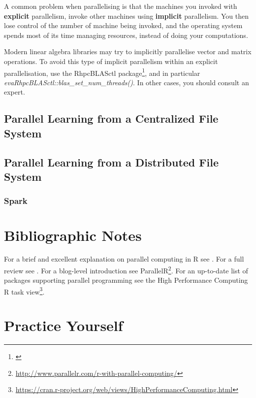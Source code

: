 \documentclass[]{book}
\renewcommand{\href}[2]{#2\footnote{\url{#1}}}
\theoremstyle{definition}
\theoremstyle{definition}
\theoremstyle{definition}
\theoremstyle{remark}
\begin{document}
A common problem when parallelising is that the machines you invoked with \textbf{explicit} parallelism, invoke other machines using \textbf{implicit} parallelism.
You then lose control of the number of machine being invoked, and the operating system spends most of its time managing resources, instead of doing your computations.

Modern linear algebra libraries may try to implicitly parallelise vector and matrix operations.
To avoid this type of implicit parallelism within an explicit parallelisation, use the \href{}{RhpcBLASctl package}, and in particular \emph{evaRhpcBLASctl::blas\_set\_num\_threads()}.
In other cases, you should consult an expert.

\hypertarget{parallel-learning-from-a-centralized-file-system}{%
\subsection{Parallel Learning from a Centralized File System}\label{parallel-learning-from-a-centralized-file-system}}

\hypertarget{parallel-learning-from-a-distributed-file-system}{%
\subsection{Parallel Learning from a Distributed File System}\label{parallel-learning-from-a-distributed-file-system}}

\hypertarget{spark}{%
\subsubsection{Spark}\label{spark}}

\hypertarget{bibliographic-notes-14}{%
\section{Bibliographic Notes}\label{bibliographic-notes-14}}

For a brief and excellent explanation on parallel computing in R see \citet{schmidberger2009state}.
For a full review see \citet{chapple2016mastering}.
For a blog-level introduction see \href{http://www.parallelr.com/r-with-parallel-computing/}{ParallelR}.
For an up-to-date list of packages supporting parallel programming see the High Performance Computing \href{https://cran.r-project.org/web/views/HighPerformanceComputing.html}{R task view}.

\hypertarget{practice-yourself-12}{%
\section{Practice Yourself}\label{practice-yourself-12}}
\end{document}
